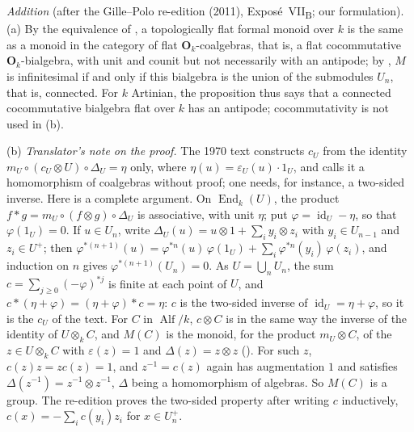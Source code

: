 \par\medskip\noindent
\emph{Addition} (after the Gille--Polo re-edition (2011),
Expos\'e~VII\textsubscript{B}; our formulation). (a) By the equivalence of
, a topologically flat formal monoid over \(k\) is the same as a
monoid in the category of flat \(\mathbf O_k\)-coalgebras, that is, a flat
cocommutative \(\mathbf O_k\)-bialgebra, with unit and counit but not
necessarily with an antipode; by , \(M\) is infinitesimal if and
only if this bialgebra is the union of the submodules \(U_n\), that is,
connected. For \(k\) Artinian, the proposition thus says that a connected
cocommutative bialgebra flat over \(k\) has an antipode; cocommutativity
is not used in (b).

(b) \emph{Translator's note on the proof.} The 1970 text constructs
\(c_U\) from the identity \(m_U\circ(c_U\otimes U)\circ\Delta_U=\eta\) only, where
\(\eta(u)=\varepsilon_U(u)\cdot1_U\), and calls it a homomorphism of
coalgebras without proof; one needs, for instance, a two-sided inverse.
Here is a complete argument. On \(\operatorname{End}_k(U)\), the product
\(f*g=m_U\circ(f\otimes g)\circ\Delta_U\) is associative, with unit
\(\eta\); put
\(\varphi=\operatorname{id}_U-\eta\), so that \(\varphi(1_U)=0\). If
\(u\in U_n\), write \(\Delta_U(u)=u\otimes1+\sum_iy_i\otimes z_i\) with
\(y_i\in U_{n-1}\) and \(z_i\in U^+\); then
\(\varphi^{*(n+1)}(u)=\varphi^{*n}(u)\,\varphi(1_U)+\sum_i\varphi^{*n}(y_i)\,\varphi(z_i)\),
and induction on \(n\) gives \(\varphi^{*(n+1)}(U_n)=0\). As
\(U=\bigcup_nU_n\), the sum \(c=\sum_{j\geq0}(-\varphi)^{*j}\) is finite at
each point of \(U\), and \(c*(\eta+\varphi)=(\eta+\varphi)*c=\eta\): \(c\) is
the two-sided inverse of \(\operatorname{id}_U=\eta+\varphi\), so it is the
\(c_U\) of the text. For \(C\) in \(\operatorname{Alf}/k\), \(c\otimes C\) is in
the same way the inverse of the identity of \(U\otimes_kC\), and \(M(C)\) is
the monoid, for the product \(m_U\otimes C\), of the \(z\in U\otimes_kC\) with
\(\varepsilon(z)=1\) and \(\Delta(z)=z\otimes z\) \textup{()}. For such
\(z\), \(c(z)z=zc(z)=1\), and \(z^{-1}=c(z)\) again has augmentation \(1\) and
satisfies \(\Delta(z^{-1})=z^{-1}\otimes z^{-1}\), \(\Delta\) being a
homomorphism of algebras. So \(M(C)\) is a group. The re-edition proves the
two-sided property after writing \(c\) inductively, \(c(x)=-\sum_ic(y_i)z_i\)
for \(x\in U_n^+\).

